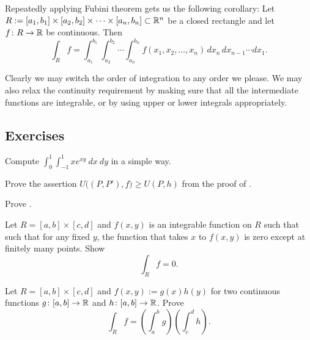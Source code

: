 Repeatedly applying Fubini theorem gets us the following
corollary:
Let $R := [a_1,b_1] \times [a_2,b_2] \times \cdots \times [a_n,b_n] \subset
{\mathbb{R}}^n$ be a closed rectangle and let
$f \colon R \to {\mathbb{R}}$ be continuous.  Then
\begin{equation*}
\int_R f = 
\int_{a_1}^{b_1}
\int_{a_2}^{b_2}
\cdots
\int_{a_n}^{b_n}
f(x_1,x_2,\ldots,x_n)
\,
dx_n
\,
dx_{n-1}
\cdots
dx_1 .
\end{equation*}

Clearly we may switch the order of integration to any order we please.
We may also relax the continuity requirement by making sure that all the
intermediate functions are integrable, or by using upper or lower integrals
appropriately.

\subsection{Exercises}

\begin{exercise}
Compute $\int_{0}^1 \int_{-1}^1 xe^{xy} ~ dx ~ dy$ in a simple way.
\end{exercise}

\begin{exercise}
Prove the assertion
$U\bigl((P,P'),f\bigr) \geq U(P,h)$ from the proof
of .
\end{exercise}

\begin{exercise}[Easy]
Prove .
\end{exercise}

\begin{exercise}
Let $R=[a,b] \times [c,d]$ and $f(x,y)$ is an integrable
function on $R$ such that
such that for any fixed $y$, the function that takes $x$ to $f(x,y)$
is zero except at finitely many points.  Show
\begin{equation*}
\int_R f = 0 .
\end{equation*}
\end{exercise}

\begin{exercise}
Let $R=[a,b] \times [c,d]$ and $f(x,y) := g(x)h(y)$ for two continuous
functions $g \colon [a,b] \to {\mathbb{R}}$ and
$h \colon [a,b] \to {\mathbb{R}}$.  Prove
\begin{equation*}
\int_R f = \left(\int_a^b g\right)\left(\int_c^d h\right) .
\end{equation*}
\end{exercise}

